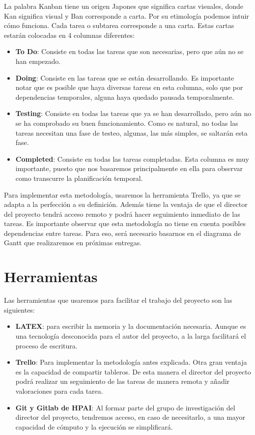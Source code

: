 La palabra Kanban tiene un origen Japones que significa cartas visuales, donde Kan significa visual y Ban corresponde a carta. Por su etimología podemos intuir cómo funciona. Cada tarea o subtarea corresponde a una carta. Estas cartas estarán colocadas en 4 columnas diferentes:

\begin{itemize}
    \item \textbf{To Do}: Consiste en todas las tareas que son necesarias, pero que aún no se han empezado.
    \item \textbf{Doing}: Consiste en las tareas que se están desarrollando. Es importante notar que es posible que haya diversas tareas en esta columna, solo que por dependencias temporales, alguna haya quedado pausada temporalmente.
    \item \textbf{Testing}: Consiste en todas las tareas que ya se han desarrollado, pero aún no se ha comprobado su buen funcionamiento. Como es natural, no todas las tareas necesitan una fase de testeo, algunas, las más simples, se saltarán esta fase.
    \item \textbf{Completed}: Consiste en todas las tareas completadas. Esta columna es muy importante, puesto que nos basaremos principalmente en ella para observar como transcurre la planificación temporal.  
\end{itemize}
Para implementar esta metodología, usaremos la herramienta Trello, ya que se adapta a la perfección a su definición. Además tiene la ventaja  de que el director del proyecto tendrá acceso remoto y podrá hacer seguimiento inmediato de las tareas. Es importante observar que esta metodología no tiene en cuenta posibles dependencias entre tareas. Para eso, será necesario basarnos en el diagrama de Gantt que realizaremos en próximas entregas.

\section{Herramientas}
Las herramientas que usaremos para facilitar el trabajo del proyecto son las siguientes:
\begin{itemize}
    \item \textbf{LATEX}: para escribir la memoria y la documentación necesaria. Aunque es una tecnología desconocida para el autor del proyecto, a la larga facilitará el proceso de escritura.
    \item \textbf{Trello}: Para implementar la metodología antes explicada. Otra gran ventaja es la capacidad de compartir tableros. De esta manera el director del proyecto podrá realizar un seguimiento de las tareas de manera remota y añadir valoraciones para cada tarea.
    \item \textbf{Git y Gitlab de HPAI}: Al formar parte del grupo de investigación del director del proyecto, tendremos acceso, en caso de necesitarlo, a una mayor capacidad de cómputo y la ejecución se simplificará.
\end{itemize}


